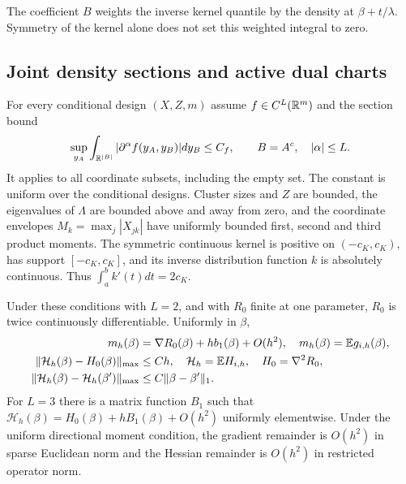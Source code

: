 The coefficient $B$ weights the inverse kernel quantile by the density
at $\beta+t/\lambda$. Symmetry of the kernel alone does not set this
weighted integral to zero.

\subsection{Joint density sections and active dual charts}

For every conditional design $(X,Z,m)$ assume $f\in C^L(\mathbb{R}^m)$ and
the section bound
\begin{equation}\label{eq:supp-density-sections}
 \sup_{y_A}\int_{\mathbb{R}^{|B|}}|\partial^\alpha f(y_A,y_B)|dy_B\leq C_f,
 \qquad B=A^c,\quad |\alpha|\leq L.
\end{equation}
It applies to all coordinate subsets, including the empty set. The
constant is uniform over the conditional designs. Cluster sizes and
$Z$ are bounded, the eigenvalues of $\Lambda$ are bounded above and
away from zero, and the coordinate envelopes
$M_k=\max_j|X_{jk}|$ have uniformly bounded first, second and third
product moments. The symmetric continuous kernel is positive on
$(-c_K,c_K)$, has support $[-c_K,c_K]$, and its inverse distribution
function $k$ is absolutely continuous. Thus
$\int_a^bk'(t)dt=2c_K$.

\begin{theorem}\label{thm:supp-target}
Under these conditions with $L=2$, and with $R_0$ finite at one
parameter, $R_0$ is twice continuously differentiable. Uniformly in
$\beta$,
\begin{align}
 m_h(\beta)&=\nabla R_0(\beta)+hb_1(\beta)+O(h^2),
       \quad m_h(\beta)=\mathbb{E} g_{i,h}(\beta),\label{eq:supp-pop-expansion}\\
 \|\mathcal H_h(\beta)-H_0(\beta)\|_{\max}&\leq Ch,
       \quad\mathcal H_h=\mathbb{E} H_{i,h},\quad H_0=\nabla^2R_0,\nonumber\\
 \|\mathcal H_h(\beta)-\mathcal H_h(\beta')\|_{\max}
       &\leq C\|\beta-\beta'\|_1.\label{eq:supp-pop-Lipschitz}
\end{align}
For $L=3$ there is a matrix function $B_1$ such that
$\mathcal H_h(\beta)=H_0(\beta)+hB_1(\beta)+O(h^2)$ uniformly
elementwise. Under the uniform directional moment condition, the
gradient remainder is $O(h^2)$ in sparse Euclidean norm and the
Hessian remainder is $O(h^2)$ in restricted operator norm.
\end{theorem}

